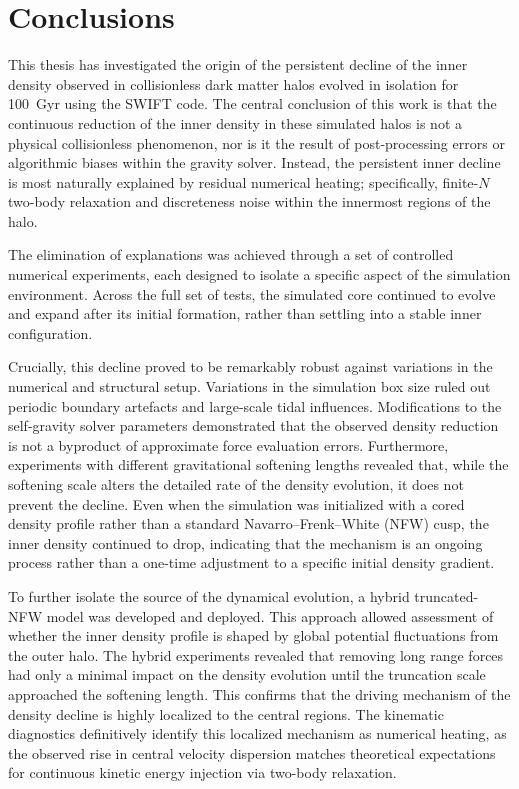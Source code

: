 \chapter{Conclusions}
This thesis has investigated the origin of the persistent decline of the inner density observed in collisionless dark matter halos evolved in isolation for 100~Gyr using the SWIFT code. The central conclusion of this work is that the continuous reduction of the inner density in these simulated halos is not a physical collisionless phenomenon, nor is it the result of post-processing errors or algorithmic biases within the gravity solver. Instead, the persistent inner decline is most naturally explained by residual numerical heating; specifically, finite-$N$ two-body relaxation and discreteness noise within the innermost regions of the halo.

The elimination of explanations was achieved through a set of controlled numerical experiments, each designed to isolate a specific aspect of the simulation environment. Across the full set of tests, the simulated core continued to evolve and expand after its initial formation, rather than settling into a stable inner configuration. 

Crucially, this decline proved to be remarkably robust against variations in the numerical and structural setup. Variations in the simulation box size ruled out periodic boundary artefacts and large-scale tidal influences. Modifications to the self-gravity solver parameters demonstrated that the observed density reduction is not a byproduct of approximate force evaluation errors. Furthermore, experiments with different gravitational softening lengths revealed that, while the softening scale alters the detailed rate of the density evolution, it does not prevent the decline. Even when the simulation was initialized with a cored density profile rather than a standard Navarro--Frenk--White (NFW) cusp, the inner density continued to drop, indicating that the mechanism is an ongoing process rather than a one-time adjustment to a specific initial density gradient.

To further isolate the source of the dynamical evolution, a hybrid truncated-NFW model was developed and deployed. This approach allowed assessment of whether the inner density profile is shaped by global potential fluctuations from the outer halo. The hybrid experiments revealed that removing long range forces had only a minimal impact on the density evolution until the truncation scale approached the softening length. This confirms that the driving mechanism of the density decline is highly localized to the central regions. The kinematic diagnostics definitively identify this localized mechanism as numerical heating, as the observed rise in central velocity dispersion matches theoretical expectations for continuous kinetic energy injection via two-body relaxation.


